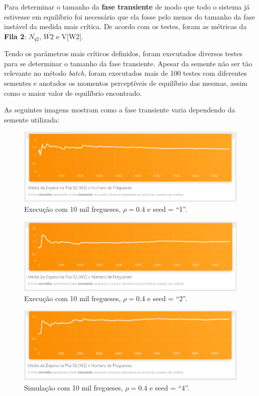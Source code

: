 \documentclass[a4paper,12pt]{report}
\begin{document}
Para determinar o tamanho da \textbf{fase transiente} de modo que
todo o sistema já estivesse em equilíbrio foi necessário que ela fosse pelo menos do tamanho da fase instável da medida mais crítica. De acordo com os testes, foram as métricas da  \textbf{Fila 2}: $\overline{N_{q2}}$, $\overline{W2}$ e V[W2].

Tendo os parâmetros mais críticos definidos, foram executados diversos testes para se determinar o tamanho da fase transiente. Apesar da semente não ser tão relevante no método \emph{batch}, foram executados mais de 100 testes com diferentes sementes e anotados os momentos perceptíveis de equilíbrio das mesmas, assim como o maior valor de equilíbrio encontrado.

As seguintes imagens mostram como a fase transiente varia dependendo da semente utilizada:

\begin{figure}[H]
\includegraphics[width=1\textwidth]{./graficos/transient/transientSeed1.png}
\vspace{-10mm}
\caption{Execução com 10 mil fregueses, $\rho=0.4$ e seed = ``1''.}
\end{figure}

\begin{figure}[H]
\includegraphics[width=1\textwidth]{./graficos/transient/transientSeed2.png}
\vspace{-10mm}
\caption{Execução com 10 mil fregueses, $\rho=0.4$ e seed = ``2''.}
\end{figure}

\begin{figure}[H]
\includegraphics[width=1\textwidth]{./graficos/transient/transientSeed4.png}
\vspace{-10mm}
\caption{Simulação com 10 mil fregueses, $\rho=0.4$ e seed = ``4''.}
\end{figure}
\end{document}
